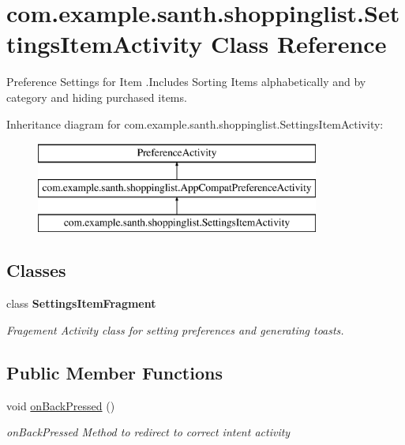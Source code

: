 \hypertarget{classcom_1_1example_1_1santh_1_1shoppinglist_1_1_settings_item_activity}{}\section{com.\+example.\+santh.\+shoppinglist.\+Settings\+Item\+Activity Class Reference}
\label{classcom_1_1example_1_1santh_1_1shoppinglist_1_1_settings_item_activity}


Preference Settings for Item .Includes Sorting Items alphabetically and by category and hiding purchased items.  


Inheritance diagram for com.\+example.\+santh.\+shoppinglist.\+Settings\+Item\+Activity\+:\begin{figure}[H]
\begin{center}
\leavevmode
\includegraphics[height=3.000000cm]{classcom_1_1example_1_1santh_1_1shoppinglist_1_1_settings_item_activity}
\end{center}
\end{figure}
\subsection*{Classes}
\begin{DoxyCompactItemize}
\item 
class {\bfseries Settings\+Item\+Fragment}
\begin{DoxyCompactList}\small\item\em Fragement Activity class for setting preferences and generating toasts. \end{DoxyCompactList}\end{DoxyCompactItemize}
\subsection*{Public Member Functions}
\begin{DoxyCompactItemize}
\item 
void \hyperlink{classcom_1_1example_1_1santh_1_1shoppinglist_1_1_settings_item_activity_ae9dee800d9843686deafa77c06909b96}{on\+Back\+Pressed} ()
\begin{DoxyCompactList}\small\item\em on\+Back\+Pressed Method to redirect to correct intent activity \end{DoxyCompactList}\end{DoxyCompactItemize}
